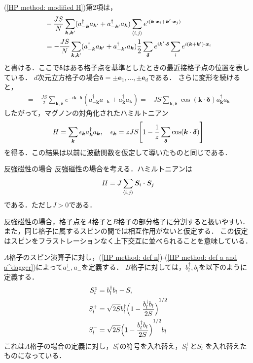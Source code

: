 \documentclass[\main/main.tex]{subfiles}
\begin{document}
\begin{frame}
    (\ref{HP method: modified H})第2項は，
    \begin{align*}
        &
        -\frac{JS}{N} \sum_{\bm{k}, \bm{k}'} (a_{-\bm{k}}^\dagger a_{\bm{k}'} + a_{-\bm{k}'}^\dagger a_{\bm{k}}) 
        \sum_{\expval{i,j}}e^{i(\bm{k} \cdot \bm{x}_i + \bm{k}'\cdot \bm{x}_j)}
        \\ &
        = - \frac{JS}{N} \sum_{\bm{k}, \bm{k}'} (a_{-\bm{k}}^\dagger a_{\bm{k}'} + a_{-\bm{k}'}^\dagger a_{\bm{k}})
        \frac{1}{2}\sum_{\bm{\delta}}e^{i \bm{k}' \cdot \bm{\delta}} \sum_{i}e^{i(\bm{k} + \bm{k}')\cdot \bm{x}_i} 
    \end{align*}
    と書ける．ここで$\bm{\delta}$はある格子点を基準としたときの最近接格子点の位置を表している．
    $d$次元立方格子の場合$\bm{\delta} = \pm \bm{e}_1, \ldots, \pm \bm{e}_d$である．
    さらに変形を続けると，
    \begin{align}
        = - \frac{JS}{2} \sum_{\bm{k},\bm{\delta}}e^{-i \bm{k} \cdot \bm{\delta}}(a_{- \bm{k}}^\dagger a_{-\bm{k}} + a_{\bm{k}}^\dagger a_{\bm{k}})
        = -JS \sum_{\bm{k}, \bm{\delta}} \cos(\bm{k}\cdot \bm{\delta})  a_{\bm{k}}^\dagger a_{\bm{k}}
    \end{align}
    したがって，マグノンの対角化されたハミルトニアン
    \begin{align}
        H = \sum_{\bm{k}} \epsilon_{\bm{k}} a_{\bm{k}}^\dagger a_{\bm{k}},
        \quad
        \epsilon_{\bm{k}} = zJS\qty[1 - \frac{1}{z}\sum_{\bm{\delta}}\cos(\bm{k}\cdot \bm{\delta})]
    \end{align}
    を得る．この結果は以前に波動関数を仮定して導いたものと同じである．
\end{frame}

\begin{frame}{反強磁性の場合}
    反強磁性の場合を考える．ハミルトニアンは
    \begin{align}
        H = J \sum_{\expval{i,j}} \bm{S}_i \cdot \bm{S}_j
    \end{align}
    である．ただし$J > 0$である．

    反強磁性の場合，格子点を$A$格子と$B$格子の部分格子に分割すると扱いやすい．
    また，同じ格子に属するスピンの間では相互作用がないと仮定する．
    この仮定はスピンをフラストレーションなく上下交互に並べられることを意味している．
\end{frame}
\begin{frame}
    $A$格子のスピン演算子に対し，(\ref{HP method: def n})-(\ref{HP method: def a and a^dagger})によって$a_-^\dagger, a_-$を定義する．
    $B$格子に対しては，$b_l^\dagger, b_l$を以下のように定義する．
    \begin{align}
        S_l^z &= b_l^\dagger b_l - S,
        \\
        S_l^+ &= \sqrt{2S}b_l^\dagger \qty\Big(1-\frac{b_l^\dagger b_l}{2S})^{1/2}
        \\
        S_l^- &= \sqrt{2S} \qty\Big(1- \frac{b_l^\dagger b_l}{2S})^{1/2}b_l
    \end{align}
    これは$A$格子の場合の定義に対し，$S_l^z$の符号を入れ替え，$S_l^+$と$S_l^-$を入れ替えたものになっている．
\end{frame}
\end{document}
